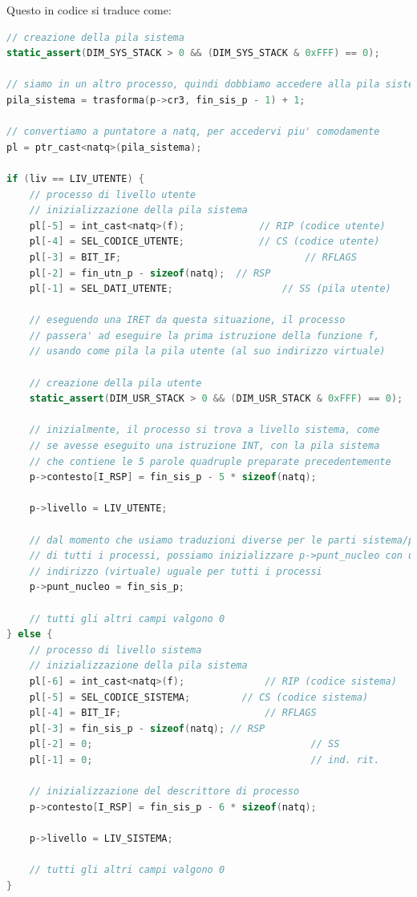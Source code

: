 \documentclass[a4paper,11pt]{article}
\begin{document}
Questo in codice si traduce come:
\begin{lstlisting}[language=C++, style=codestyle]	
// creazione della pila sistema
static_assert(DIM_SYS_STACK > 0 && (DIM_SYS_STACK & 0xFFF) == 0);

// siamo in un altro processo, quindi dobbiamo accedere alla pila sistema tramite la finestra FM
pila_sistema = trasforma(p->cr3, fin_sis_p - 1) + 1;

// convertiamo a puntatore a natq, per accedervi piu' comodamente
pl = ptr_cast<natq>(pila_sistema);

if (liv == LIV_UTENTE) {
	// processo di livello utente
	// inizializzazione della pila sistema
	pl[-5] = int_cast<natq>(f);	    		// RIP (codice utente)
	pl[-4] = SEL_CODICE_UTENTE;	    		// CS (codice utente)
	pl[-3] = BIT_IF;	    	    				// RFLAGS
	pl[-2] = fin_utn_p - sizeof(natq);  // RSP
	pl[-1] = SEL_DATI_UTENTE;	    			// SS (pila utente)

	// eseguendo una IRET da questa situazione, il processo
	// passera' ad eseguire la prima istruzione della funzione f,
	// usando come pila la pila utente (al suo indirizzo virtuale)

	// creazione della pila utente
	static_assert(DIM_USR_STACK > 0 && (DIM_USR_STACK & 0xFFF) == 0);

	// inizialmente, il processo si trova a livello sistema, come
	// se avesse eseguito una istruzione INT, con la pila sistema
	// che contiene le 5 parole quadruple preparate precedentemente
	p->contesto[I_RSP] = fin_sis_p - 5 * sizeof(natq);

	p->livello = LIV_UTENTE;

	// dal momento che usiamo traduzioni diverse per le parti sistema/private
	// di tutti i processi, possiamo inizializzare p->punt_nucleo con un
	// indirizzo (virtuale) uguale per tutti i processi
	p->punt_nucleo = fin_sis_p;

	// tutti gli altri campi valgono 0
} else {
	// processo di livello sistema
	// inizializzazione della pila sistema
	pl[-6] = int_cast<natq>(f);				 // RIP (codice sistema)
	pl[-5] = SEL_CODICE_SISTEMA;  		 // CS (codice sistema)
	pl[-4] = BIT_IF;  	        			 // RFLAGS
	pl[-3] = fin_sis_p - sizeof(natq); // RSP
	pl[-2] = 0;			        					 // SS
	pl[-1] = 0;			        					 // ind. rit.

	// inizializzazione del descrittore di processo
	p->contesto[I_RSP] = fin_sis_p - 6 * sizeof(natq);

	p->livello = LIV_SISTEMA;

	// tutti gli altri campi valgono 0
}
\end{lstlisting}
\end{document}
